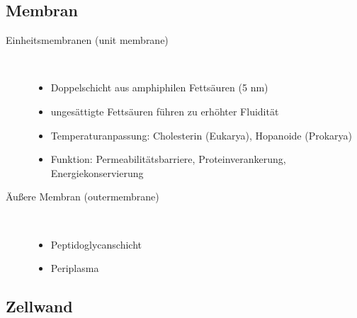 \subsection{Membran}
\begin{description}
	\item[Einheitsmembranen (unit membrane)] \hfill \\
		\begin{itemize}
			\item Doppelschicht aus amphiphilen Fettsäuren (5 nm)
			\item ungesättigte Fettsäuren führen zu erhöhter Fluidität
			\item Temperaturanpassung: Cholesterin (Eukarya), Hopanoide (Prokarya)
			\item Funktion: Permeabilitätsbarriere, Proteinverankerung, Energiekonservierung
		\end{itemize}

	\item[Äußere Membran (outermembrane)] \hfill \\
		\begin{itemize}
			\item Peptidoglycanschicht
			\item Periplasma
		\end{itemize}
	
\end{description}

\subsection{Zellwand}
